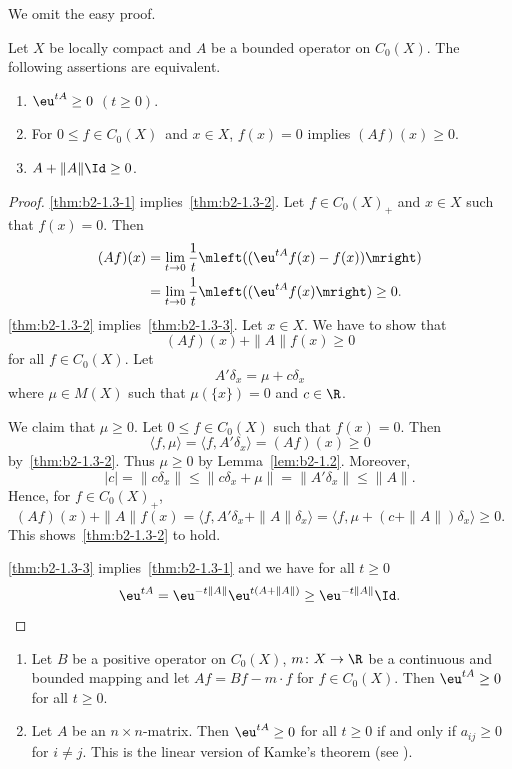 We omit the easy proof.
\begin{theorem}\label{thm:b2-1.3}
Let $X$ be locally compact and $A$ be a bounded operator on $C_{0}(X)$.
The following assertions are equivalent.
\begin{enumerate}[\upshape (a)]
\item \label{thm:b2-1.3-1}
$\eu^{tA} \geq 0$ $(t \geq 0)$.
\item \label{thm:b2-1.3-2}
For  $0 \leq f \in C_{0}(X)$\, and  $x \in X$,  $f(x) = 0$ implies $(Af)(x) \geq 0$.
\item \label{thm:b2-1.3-3}
$A + \|A\|\Id \geq 0$.
\end{enumerate}
\end{theorem}
\begin{proof}
\ref{thm:b2-1.3-1} implies~\ref{thm:b2-1.3-2}.
Let $f \in C_{0}(X)_{+}$ and $x \in X$ such that $f(x) = 0$.
Then
\begin{align*}
(Af)(x) &= \lim_{t \to 0} \frac{1}{t} \mleft( (\eu^{tA}f(x) - f(x)) \mright) \\
&= \lim_{t \to 0}\frac{1}{t} \mleft( (\eu^{tA}f(x) \mright) \geq 0 .
\end{align*}
\ref{thm:b2-1.3-2} implies~\ref{thm:b2-1.3-3}.
Let $x \in X$.
We have to show that 
%
\[
	(Af)(x) + \|A\|f(x) \geq 0
\]
%
for all $f \in C_{0}(X)$.
Let 
%
\[
	A'\delta_{x} = \mu + c\delta_{x}
\]
%
where $\mu \in M(X)$ such that $\mu(\{x\}) = 0$ and $c \in \R$.

We claim that $\mu \geq 0$.
Let $0 \leq f \in C_{0}(X)$ such that $f(x) = 0$.
Then 
%
\[
	\langle f,\mu \rangle = \langle f,A'\delta_{x} \rangle = (Af)(x) \geq 0 
\]
%
by~\ref{thm:b2-1.3-2}.
Thus $\mu \geq 0$ by Lemma~\ref{lem:b2-1.2}.
Moreover, 
%
\[
	|c| = \|c\delta_{x}\| \leq \|c\delta_{x} + \mu\| = \|A'\delta_{x}\| \leq \|A\| .
\]
%
Hence, for $f \in C_{0}(X)_{+}$,
\[
(Af)(x) + \|A\|f(x) = \langle f, A'\delta_{x} + \|A\|\delta_{x} \rangle = \langle f, \mu + (c+\|A\|)\delta_{x} \rangle \geq 0.
\]
This shows~\ref{thm:b2-1.3-2} to hold.

\ref{thm:b2-1.3-3} implies~\ref{thm:b2-1.3-1} and we have for all $t \geq 0$
%
\begin{equation*}
	\eu^{tA} = \eu^{-t\|A\|}\eu^{t(A+\|A\|)} \geq \eu^{-t\|A\|}\Id .
	\qedhere
	\qedhere
\end{equation*}
%
\end{proof}
\begin{example}\label{ex:b2-1.4} 
 
\begin{enumerate}[\upshape (i), wide, labelindent=.5ex] 
\item \label{ex:b2-1.4-1}
Let $B$ be a positive operator on $C_{0}(X)$, $m \colon X \to \R$ be a continuous and bounded mapping and let $Af = Bf - m \cdot f$ for $f \in C_{0}(X)$.
Then $\eu^{tA} \geq 0$ for all $t \geq 0$.
		
\item \label{ex:b2-1.4-2}
Let $A$ be an $n \times n$-matrix.
Then $\eu^{tA} \geq 0$ for all $t \geq 0$ if and only if\/ $a_{ij} \geq 0$ for $i \neq j$.
This is the linear version of Kamke's theorem (see \textcite{kamke:1932}).
\end{enumerate}
\end{example}
